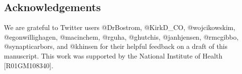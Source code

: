 \subsection*{Acknowledgements}
We are grateful to Twitter users @DrBostrom,
@KirkD_CO,
@wojcikowskim,
@egonwillighagen,
@macinchem,
@rguha,
@ghutchis,
@janhjensen,
@rmcgibbo, 
@synapticarbors, and
@khinsen 
for their helpful feedback on a draft of this manuscript.
This work was supported by the National Institute of Health [R01GM108340].